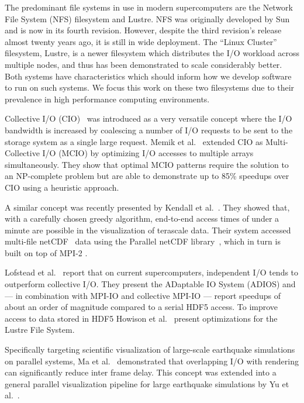The predominant file systems in use in modern supercomputers are the
Network File System (NFS) filesystem and Lustre.  NFS was originally
developed by Sun and is now in its fourth revision.  However, despite
the third revision's release almost twenty years
ago\cite{Callaghan:1995:NFSv3,Hildebrand:2004:NAHP}, it is still in
wide deployment.  The ``Linux Cluster'' filesystem,
Lustre\cite{Sun:2008:PSIW}, is a newer filesystem which distributes
the I/O workload across multiple nodes, and thus has been demonstrated
to scale considerably better.  Both systems have characteristics which
should inform how we develop software to run on such systems.  We focus
this work on these two filesystems due to their prevalence in high
performance computing environments.

Collective I/O (CIO)~\cite{Nitzberg:1995:PIO, Seamons:1995:SDCI,
Kotz:1997:DIMF} was introduced as a very versatile concept where the
I/O bandwidth is increased by coalescing a number of I/O requests to be
sent to the storage system as a single large request.
Memik et al.~\cite{Memik:2002:EIA} extended CIO as Multi-Collective
I/O (MCIO) by optimizing I/O accesses to multiple arrays
simultaneously. They show that optimal MCIO patterns require the
solution to an NP-complete problem but are able to demonstrate up to
85\% speedups over CIO using a heuristic approach.

A similar concept was recently presented by Kendall et
al.~\cite{Kendall:2009:TDO}. They showed that, with a carefully chosen
greedy algorithm, end-to-end access times of under a minute are
possible in the visualization of terascale data.  Their system accessed
multi-file netCDF~\cite{Rew:1990:NAIF} data using the Parallel netCDF
library~\cite{Li:2003:PNAH}, which in turn is built on top of MPI-2
\cite{Gropp:1998:MTCR}.

Lofstead et
al.~\cite{Lofstead:2008:FIAI,Lofstead:2009:AMRI,ADIOS:Manual} report
that on current supercomputers, independent I/O tends to outperform
collective I/O. They present the ADaptable IO System (ADIOS) and ---
in combination with MPI-IO and collective MPI-IO --- report speedups
of about an order of magnitude compared to a serial HDF5 access. To
improve access to data stored in HDF5
Howison et al.~\cite{Howison:2010:THFL} present optimizations for the
Lustre File System.

Specifically targeting scientific visualization of large-scale
earthquake simulations on parallel systems, Ma et
al.~\cite{Ma:2003:VVLS} demonstrated that overlapping I/O with
rendering can significantly reduce inter frame delay. This concept was
extended into a general parallel visualization pipeline for large
earthquake simulations by Yu et al.~\cite{Yu:2004:PVPF}.

